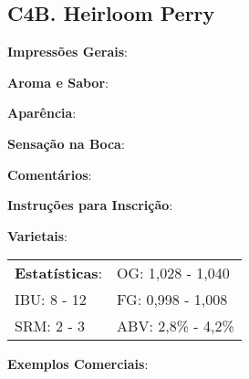 \subsection*{C4B. Heirloom Perry}

\textbf{Impressões Gerais}:

\textbf{Aroma e Sabor}:

\textbf{Aparência}:

\textbf{Sensação na Boca}:

\textbf{Comentários}:

\textbf{Instruções para Inscrição}:

\textbf{Varietais}:

\begin{tabular}{@{}p{35mm}p{35mm}@{}}
  \textbf{Estatísticas}: & OG: 1,028 - 1,040 \\
  IBU: 8 - 12  & FG: 0,998 - 1,008 \\
  SRM: 2 - 3  & ABV: 2,8\% - 4,2\%
\end{tabular}

\textbf{Exemplos Comerciais}: